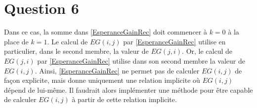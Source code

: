 \documentclass[a4paper,11pt]{amsart}
\theoremstyle{plain}
\begin{document}
\section{Question 6}

Dans ce cas, la somme dans \eqref{EsperanceGainRec} doit commencer à $k = 0$ à la place de $k = 1$. Le calcul de $EG(i, j)$ par \eqref{EsperanceGainRec} utilise en particulier, dans le second membre, la valeur de $EG(j, i)$. Or, le calcul de $EG(j, i)$ par \eqref{EsperanceGainRec} utilise dans son second membre la valeur de $EG(i, j)$. Ainsi, \eqref{EsperanceGainRec} ne permet pas de calculer $EG(i, j)$ de façon explicite, mais donne uniquement une relation implicite où $EG(i, j)$ dépend de lui-même. Il faudrait alors implémenter une méthode pour être capable de calculer $EG(i, j)$ à partir de cette relation implicite.
\end{document}
